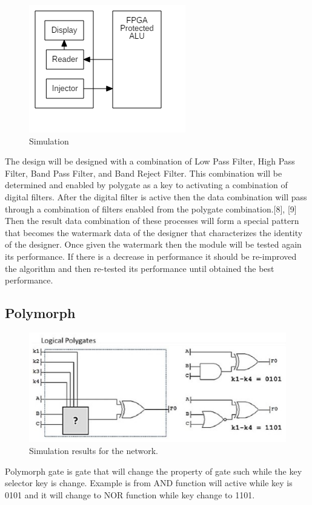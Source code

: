 \documentclass[10pt,journal,compsoc,letterpaper,final]{IEEEtran}
\begin{document}
\begin{figure}
	\centering
	\includegraphics[scale=0.5]{images/simulasiAlat}
	\caption{Simulation}
	\label{simulation}
\end{figure}


The design will be designed with a combination of Low Pass Filter, High Pass Filter, Band Pass Filter, and Band Reject Filter. This combination will be determined and enabled by polygate as a key to activating a combination of digital filters. After the digital filter is active then the data combination will pass through a combination of filters enabled from the polygate combination.[8], [9] Then the result data combination of these processes will form a special pattern that becomes the watermark data of the designer that characterizes the identity of the designer. Once given the watermark then the module will be tested again its performance. If there is a decrease in performance it should be re-improved the algorithm and then re-tested its performance until obtained the best performance.

\subsection{Polymorph}
\begin{figure}[ht]
	\centering
	\includegraphics[scale=0.65]{images/polymorphgate}
	\caption{Simulation results for the network.}
	\label{fig_sim}
\end{figure}
Polymorph gate is gate that will change the property of gate such while the key selector key is change. Example is from AND function will active while key is 0101 and it will change to NOR function while key change to 1101.
\end{document}
